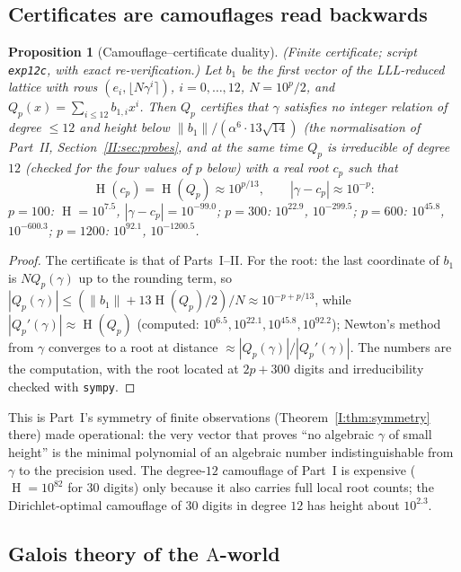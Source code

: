 \documentclass[11pt,a4paper]{article}
\DeclareMathOperator{\Ht}{H}
\newtheorem{proposition}[theorem]{Proposition}
\theoremstyle{definition}
\theoremstyle{remark}
\numberwithin{equation}{section}
\begin{document}
\subsection{Certificates are camouflages read backwards}

\begin{proposition}[Camouflage--certificate duality]\label{IV:prop:duality}
\textup{(Finite certificate; script \texttt{exp12c}, with exact re-verification.)} Let $b_1$
be the first vector of the LLL-reduced lattice with rows $(e_i,\lfloor N\gamma^i\rceil)$,
$i=0,\dots,12$, $N=10^p/2$, and $Q_p(x)=\sum_{i\le12}b_{1,i}x^i$. Then $Q_p$ certifies
that $\gamma$ satisfies no integer relation of degree $\le12$ and height below
$\|b_1\|/(\alpha^6\cdot13\sqrt{14})$ (the normalisation of Part~II, Section~\ref{II:sec:probes}, and at
the same time $Q_p$ is irreducible of degree $12$ (checked for the four values of $p$
below) with a real root $c_p$ such that
\[
 \Ht(c_p)=\Ht(Q_p)\approx10^{p/13},\qquad |\gamma-c_p|\approx10^{-p}:
\]
$p=100$: $\Ht=10^{7.5}$, $|\gamma-c_p|=10^{-99.0}$; $p=300$: $10^{22.9}$, $10^{-299.5}$;
$p=600$: $10^{45.8}$, $10^{-600.3}$; $p=1200$: $10^{92.1}$, $10^{-1200.5}$.
\end{proposition}
\begin{proof}
The certificate is that of Parts~I--II. For the root: the last coordinate of $b_1$ is
$NQ_p(\gamma)$ up to the rounding term, so $|Q_p(\gamma)|\le(\|b_1\|+13\Ht(Q_p)/2)/N\approx10^{-p+p/13}$,
while $|Q_p'(\gamma)|\approx\Ht(Q_p)$ (computed: $10^{6.5},10^{22.1},10^{45.8},10^{92.2}$);
Newton's method from $\gamma$ converges to a root at distance
$\approx|Q_p(\gamma)|/|Q_p'(\gamma)|$. The numbers are the computation, with the root
located at $2p+300$ digits and irreducibility checked with \texttt{sympy}.
\end{proof}

This is Part~I's symmetry of finite observations (Theorem~\ref{I:thm:symmetry} there) made operational:
the very vector that proves ``no algebraic $\gamma$ of small height'' is the minimal
polynomial of an algebraic number indistinguishable from $\gamma$ to the precision used.
The degree-$12$ camouflage of Part~I is expensive ($\Ht=10^{82}$ for $30$ digits) only
because it also carries full local root counts; the Dirichlet-optimal camouflage of
$30$ digits in degree $12$ has height about $10^{2.3}$.

\subsection{Galois theory of the $\mathrm A$-world}
\end{document}
